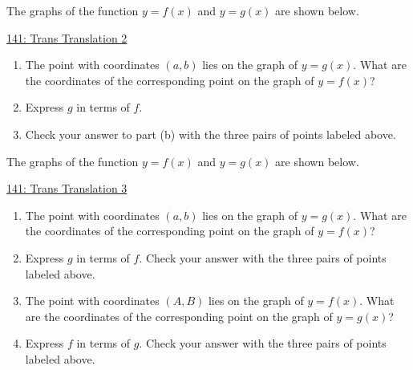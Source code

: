 \documentclass{ximera}
\begin{document}
\begin{question} \label{QK3f3fsf}
The graphs of the function $y=f(x)$ and $y=g(x)$ are shown below.

\begin{onlineOnly}
    \begin{center}
\end{center}
\end{onlineOnly}

\href{https://www.desmos.com/calculator/po1qtxqaxe}{141: Trans Translation 2}

\begin{enumerate}
\item The point with coordinates $(a,b)$ lies on the graph of $y=g(x)$. What are the coordinates of the corresponding point on the graph of $y=f(x)$?

\item Express $g$ in terms of $f$. 

\item Check your answer to part (b) with the three pairs of points labeled above. 
\end{enumerate}

\end{question}

\begin{question} \label{QK3f3fs33f}
The graphs of the function $y=f(x)$ and $y=g(x)$ are shown below.

\begin{onlineOnly}
    \begin{center}
\end{center}
\end{onlineOnly}

\href{https://www.desmos.com/calculator/jetifi2e8e}{141: Trans Translation 3}

\begin{enumerate}
\item The point with coordinates $(a,b)$ lies on the graph of $y=g(x)$. What are the coordinates of the corresponding point on the graph of $y=f(x)$?

\item Express $g$ in terms of $f$. Check your answer with the three pairs of points labeled above. 

\item The point with coordinates $(A,B)$ lies on the graph of $y=f(x)$. What are the coordinates of the corresponding point on the graph of $y=g(x)$?

\item Express $f$ in terms of $g$. Check your answer with the three pairs of points labeled above.
\end{enumerate}

\end{question}
\end{document}
